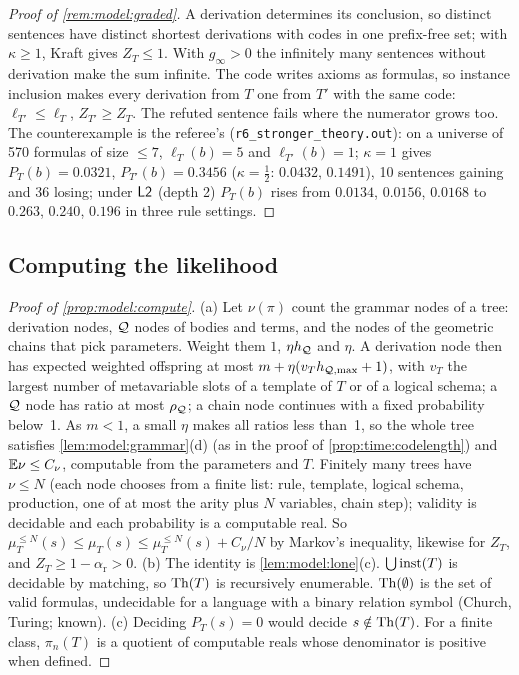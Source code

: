\begin{proof}[Proof of \cref{rem:model:graded}]
A derivation determines its conclusion, so distinct sentences have distinct shortest derivations with codes in one prefix-free set; with $\kappa\ge1$, Kraft gives $Z_T\le1$. With $g_\infty>0$ the infinitely many sentences without derivation make the sum infinite. The code writes axioms as formulas, so instance inclusion makes every derivation from $T$ one from $T'$ with the same code: $\ell_{T'}\le\ell_T$, $Z_{T'}\ge Z_T$. The refuted sentence fails where the numerator grows too. The counterexample is the referee's (\texttt{r6\_stronger\_theory.out}): on a universe of 570 formulas of size $\le7$, $\ell_T(b)=5$ and $\ell_{T'}(b)=1$; $\kappa=1$ gives $P_T(b)=0.0321$, $P_{T'}(b)=0.3456$ ($\kappa=\tfrac12$: $0.0432$, $0.1491$), 10 sentences gaining and 36 losing; under $\mathord{\mathsf{L2}}$ (depth 2) $P_T(b)$ rises from $0.0134$, $0.0156$, $0.0168$ to $0.263$, $0.240$, $0.196$ in three rule settings.
\end{proof}

\subsection{Computing the likelihood}\label{app:model:compute}

\begin{proof}[Proof of \cref{prop:model:compute}]
(a) Let $\nu(\pi)$ count the grammar nodes of a tree: derivation nodes, $\mathcal{Q}$ nodes of bodies and terms, and the nodes of the geometric chains that pick parameters. Weight them $1$, $\eta h_{\mathcal{Q}}$ and $\eta$. A derivation node then has expected weighted offspring at most $m+\eta(v_Th_{\mathcal{Q},\max}+1)$, with $v_T$ the largest number of metavariable slots of a template of $T$ or of a logical schema; a $\mathcal{Q}$ node has ratio at most $\rho_{\mathcal{Q}}$; a chain node continues with a fixed probability below~1. As $m<1$, a small $\eta$ makes all ratios less than~1, so the whole tree satisfies \cref{lem:model:grammar}(d) (as in the proof of \cref{prop:time:codelength}) and $\mathbb{E}\nu\le C_\nu$, computable from the parameters and $T$. Finitely many trees have $\nu\le N$ (each node chooses from a finite list: rule, template, logical schema, production, one of at most the arity plus $N$ variables, chain step); validity is decidable and each probability is a computable real. So $\mu^{\le N}_T(s)\le\mu_T(s)\le\mu^{\le N}_T(s)+C_\nu/N$ by Markov's inequality, likewise for $Z_T$, and $Z_T\ge1-\alpha_{\mathrm r}>0$.
(b) The identity is \cref{lem:model:lone}(c). $\bigcup\mathrm{inst}(T)$ is decidable by matching, so $\mathrm{Th}(T)$ is recursively enumerable. $\mathrm{Th}(\emptyset)$ is the set of valid formulas, undecidable for a language with a binary relation symbol (Church, Turing; known).
(c) Deciding $P_T(s)=0$ would decide $s\notin\mathrm{Th}(T)$. For a finite class, $\pi_n(T)$ is a quotient of computable reals whose denominator is positive when defined.
\end{proof}


